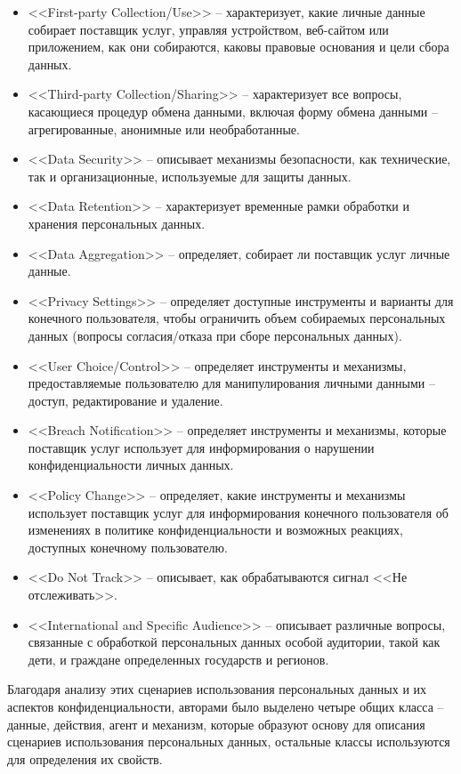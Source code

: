 \documentclass[../main]{subfiles}
\begin{document}
\begin{itemize}
    \item <<First-party Collection/Use>> -- характеризует, какие личные данные собирает поставщик услуг, управляя устройством, веб-сайтом или приложением, как они собираются, каковы правовые основания и цели сбора данных.
    \item <<Third-party Collection/Sharing>> -- характеризует все вопросы, касающиеся процедур обмена данными, включая форму обмена данными -- агрегированные, анонимные или необработанные.
    \item <<Data Security>> -- описывает механизмы безопасности, как технические, так и организационные, используемые для защиты данных.
    \item <<Data Retention>> -- характеризует временные рамки обработки и хранения персональных данных.
    \item <<Data Aggregation>> -- определяет, собирает ли поставщик услуг личные данные.
    \item <<Privacy Settings>> -- определяет доступные инструменты и варианты для конечного пользователя, чтобы ограничить объем собираемых персональных данных (вопросы согласия/отказа при сборе персональных данных).
    \item <<User Choice/Control>> -- определяет инструменты и механизмы, предоставляемые пользователю для манипулирования личными данными -- доступ, редактирование и удаление.
    \item <<Breach Notification>> -- определяет инструменты и механизмы, которые поставщик услуг использует для информирования о нарушении конфиденциальности личных данных.
    \item <<Policy Change>> -- определяет, какие инструменты и механизмы использует поставщик услуг для информирования конечного пользователя об изменениях в политике конфиденциальности и возможных реакциях, доступных конечному пользователю.
    \item <<Do Not Track>> -- описывает, как обрабатываются сигнал <<Не отслеживать>>.
    \item <<International and Specific Audience>> -- описывает различные вопросы, связанные с обработкой персональных данных особой аудитории, такой как дети, и граждане определенных государств и регионов.
\end{itemize}

Благодаря анализу этих сценариев использования персональных данных и их аспектов конфиденциальности, авторами было выделено четыре общих класса -- данные, действия, агент и механизм, которые образуют основу для описания сценариев использования персональных данных, остальные классы используются для определения их свойств.
\end{document}
